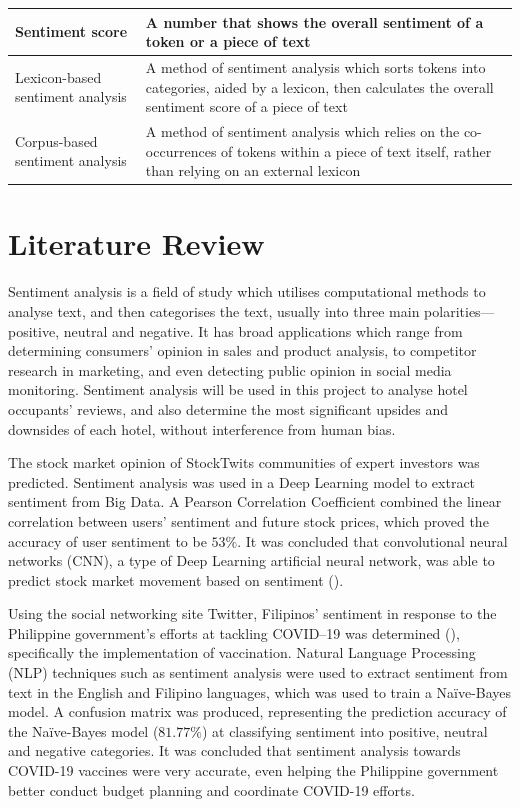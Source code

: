 \documentclass[12pt,bibliography=totocnumbered]{scrartcl}
\begin{document}
{\begin{table}[htpb]
\begin{center}
\begin{tabular}[]{|p{}|p{}|}
			\hline
			Sentiment score                  & A number that shows the overall sentiment of a token or a piece of text                                                                                      \\
			\hline
			Lexicon-based sentiment analysis & A method of sentiment analysis which sorts tokens into categories, aided by a lexicon, then calculates the overall sentiment score of a piece of text        \\
			\hline
			Corpus-based sentiment analysis  & A method of sentiment analysis which relies on the co-occurrences of tokens within a piece of text itself, rather than relying on an external lexicon        \\
			\hline
		\end{tabular}
	\end{center}
\end{table}

\pagebreak

\section{Literature Review}
Sentiment analysis is a field of study which utilises computational methods to analyse text,
and then categorises the text, usually into three main polarities---positive, neutral
and negative. It has broad applications which range from determining consumers' opinion in
sales and product analysis, to competitor research in marketing, and even detecting public
opinion in social media monitoring. Sentiment analysis will be used in this project to
analyse hotel occupants' reviews, and also determine the most significant upsides
and downsides of each hotel, without interference from human bias.

The stock market opinion of StockTwits communities
of expert investors was predicted. Sentiment analysis was used in a Deep Learning model to extract
sentiment from Big Data. A Pearson Correlation Coefficient combined the linear correlation
between users' sentiment and future stock prices, which
proved the accuracy of user sentiment to be $53\%$.
It was concluded that convolutional neural networks (CNN), a type of Deep Learning
artificial neural network, was able to predict stock market movement based on sentiment (\cite{stock}).

Using the social networking site Twitter,
Filipinos' sentiment in response to the Philippine government's efforts
at tackling COVID--19 was determined (\cite{twitter}), specifically the implementation of vaccination. Natural
Language Processing (NLP) techniques such as sentiment analysis were used to
extract sentiment from text in the English and Filipino languages, which was used to
train a Naïve-Bayes model. A confusion matrix was produced, representing the
prediction accuracy of the Naïve-Bayes model ($81.77\%$) at classifying
sentiment into positive, neutral and negative categories. It was concluded that
sentiment analysis towards COVID-19 vaccines were very accurate, even helping the
Philippine government better conduct budget planning and coordinate COVID-19 efforts.

}
\end{document}
